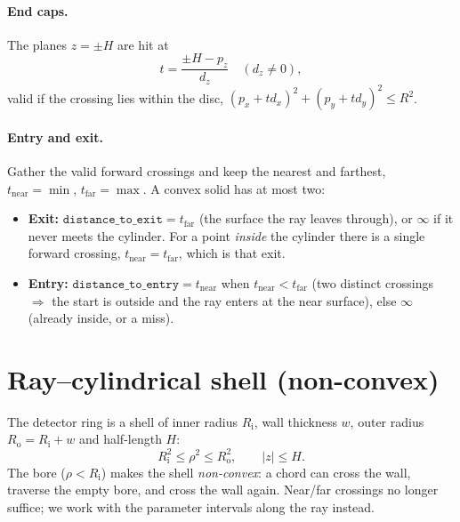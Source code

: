 \documentclass[11pt]{article}
\newcommand{\Ri}{R_{\mathrm{i}}}
\newcommand{\Ro}{R_{\mathrm{o}}}
\begin{document}
\paragraph{End caps.} The planes $z=\pm H$ are hit at
\begin{equation}
  t = \frac{\pm H - p_z}{d_z} \quad (d_z \neq 0),
\end{equation}
valid if the crossing lies within the disc, $(p_x+t d_x)^2+(p_y+t d_y)^2 \le R^2$.

\paragraph{Entry and exit.} Gather the valid forward crossings and keep the nearest
and farthest, $t_{\mathrm{near}} = \min$, $t_{\mathrm{far}} = \max$. A convex solid
has at most two:
\begin{itemize}[nosep]
\item \textbf{Exit:} $\texttt{distance\_to\_exit} = t_{\mathrm{far}}$ (the surface the
  ray leaves through), or $\infty$ if it never meets the cylinder. For a point
  \emph{inside} the cylinder there is a single forward crossing,
  $t_{\mathrm{near}}=t_{\mathrm{far}}$, which is that exit.
\item \textbf{Entry:} $\texttt{distance\_to\_entry} = t_{\mathrm{near}}$ when
  $t_{\mathrm{near}} < t_{\mathrm{far}}$ (two distinct crossings $\Rightarrow$ the
  start is outside and the ray enters at the near surface), else $\infty$ (already
  inside, or a miss).
\end{itemize}

\section{Ray--cylindrical shell (non-convex)}
\label{sec:shell}

The detector ring is a shell of inner radius $\Ri$, wall thickness $w$, outer radius
$\Ro=\Ri+w$ and half-length $H$:
\begin{equation}
  \Ri^2 \le \rho^2 \le \Ro^2, \qquad |z| \le H .
\end{equation}
The bore ($\rho<\Ri$) makes the shell \emph{non-convex}: a chord can cross the wall,
traverse the empty bore, and cross the wall again. Near/far crossings no longer
suffice; we work with the parameter intervals along the ray instead.
\end{document}
